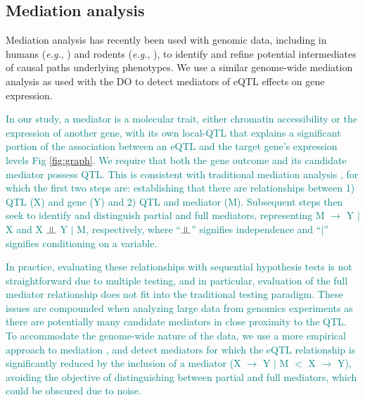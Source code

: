 \documentclass[10pt,letterpaper]{article}
\newcommand{\indep}{\rotatebox[origin=c]{90}{$\models$}}
\newcommand{\eg}{\emph{e.g.}\xspace}
\newcommand{\GKinline}[1]{\textcolor{teal}{#1}}
\begin{document}
\subsection*{Mediation analysis}

Mediation analysis has recently been used with genomic data, including in humans (\eg, \cite{Battle2014,Raulerson2019}) and rodents (\eg, \cite{Keele2018,Oreper2018}), to identify and refine potential intermediates of causal paths underlying phenotypes. We use a similar genome-wide mediation analysis as used with the DO \cite{Chick2016, Keller2018} to detect mediators of eQTL effects on gene expression.

\GKinline{In our study, a mediator is a molecular trait, either chromatin accessibility or the expression of another gene, with its own local-QTL that explains a significant portion of the association between an eQTL and the target gene's expression levels Fig \ref{fig:graph}. We require that both the gene outcome and its candidate mediator possess QTL. This is consistent with traditional mediation analysis \cite{Baron1986}, for which the first two steps are: establishing that there are relationships between 1) QTL (X) and gene (Y) and 2) QTL and mediator (M). Subsequent steps then seek to identify and distinguish partial and full mediators, representing M $\rightarrow$ Y $|$ X and X $\indep$ Y $|$ M, respectively, where ``$\indep$'' signifies independence and ``$|$'' signifies conditioning on a variable.}

\GKinline{In practice, evaluating these relationships with sequential hypothesis tests is not straightforward due to multiple testing, and in particular, evaluation of the full mediator relationship does not fit into the traditional testing paradigm. These issues are compounded when analyzing large data from genomics experiments as there are potentially many candidate mediators in close proximity to the QTL. To accommodate the genome-wide nature of the data, we use a more empirical approach to mediation \cite{Chick2016,Keller2018,Skelly2019}, and detect mediators for which the eQTL relationship is significantly reduced by the inclusion of a mediator (X $\rightarrow$ Y $|$ M $<$ X $\rightarrow$ Y), avoiding the objective of distinguishing between partial and full mediators, which could be obscured due to noise.}
\end{document}
